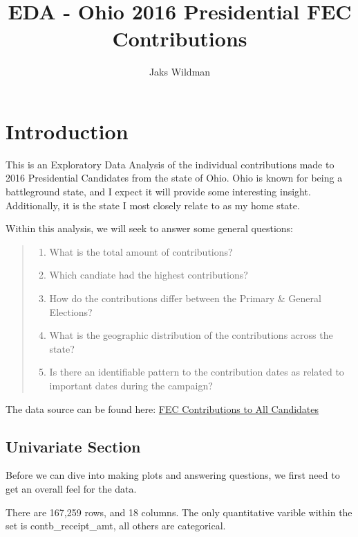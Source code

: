 \documentclass[]{article}
\title{EDA - Ohio 2016 Presidential FEC Contributions}
\author{Jaks Wildman}
\date{}
\providecommand{\tightlist}{%
  \setlength{\itemsep}{0pt}\setlength{\parskip}{0pt}}
\begin{document}
\maketitle

\hypertarget{introduction}{%
\section{Introduction}\label{introduction}}

This is an Exploratory Data Analysis of the individual contributions
made to 2016 Presidential Candidates from the state of Ohio. Ohio is
known for being a battleground state, and I expect it will provide some
interesting insight. Additionally, it is the state I most closely relate
to as my home state.

Within this analysis, we will seek to answer some general questions:

\begin{quote}
\begin{enumerate}
\def\labelenumi{\arabic{enumi}.}
\tightlist
\item
  What is the total amount of contributions?
\item
  Which candiate had the highest contributions?
\item
  How do the contributions differ between the Primary \& General
  Elections?
\item
  What is the geographic distribution of the contributions across the
  state?
\item
  Is there an identifiable pattern to the contribution dates as related
  to important dates during the campaign?
\end{enumerate}
\end{quote}

The data source can be found here:
\href{https://classic.fec.gov/disclosurep/pnational.do}{FEC
Contributions to All Candidates}

\hypertarget{univariate-section}{%
\subsection{Univariate Section}\label{univariate-section}}

Before we can dive into making plots and answering questions, we first
need to get an overall feel for the data.

There are 167,259 rows, and 18 columns. The only quantitative varible
within the set is contb\_receipt\_amt, all others are categorical.
\end{document}
